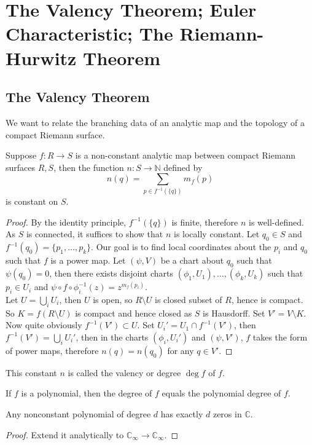 \section{The Valency Theorem; Euler Characteristic; The Riemann-Hurwitz Theorem}
\subsection{The Valency Theorem}
We want to relate the branching data of an analytic map and the topology of a compact Riemann surface.
\begin{theorem}
    Suppose $f:R\to S$ is a non-constant analytic map between compact Riemann surfaces $R,S$, then the function $n:S\to\mathbb N$ defined by
    $$n(q)=\sum_{p\in f^{-1}(\{q\})}m_f(p)$$
    is constant on $S$.
\end{theorem}
\begin{proof}
    By the identity principle, $f^{-1}(\{q\})$ is finite, therefore $n$ is well-defined.
    As $S$ is connected, it suffices to show that $n$ is locally constant.
    Let $q_0\in S$ and $f^{-1}(q_0)=\{p_1,\ldots,p_k\}$.
    Our goal is to find local coordinates about the $p_i$ and $q_0$ such that $f$ is a power map.
    Let $(\psi,V)$ be a chart about $q_0$ such that $\psi(q_0)=0$, then there exists disjoint charts $(\phi_1,U_1),\ldots,(\phi_k,U_k)$ such that $p_i\in U_i$ and $\psi\circ f\circ\phi_i^{-1}(z)=z^{m_f(p_i)}$.\\
    Let $U=\bigcup_iU_i$, then $U$ is open, so $R\setminus U$ is closed subset of $R$, hence is compact.
    So $K=f(R\setminus U)$ is compact and hence closed as $S$ is Hausdorff.
    Set $V'=V\setminus K$.
    Now quite obviously $f^{-1}(V')\subset U$.
    Set $U_i'=U_1\cap f^{-1}(V')$, then $f^{-1}(V')=\bigcup_iU_i'$, then in the charts $(\phi_i,U_i')$ and $(\psi,V')$, $f$ takes the form of power maps, therefore $n(q)=n(q_0)$ for any $q\in V'$.
\end{proof}
\begin{definition}
    This constant $n$ is called the valency or degree $\deg f$ of $f$.
\end{definition}
\begin{example}
    If $f$ is a polynomial, then the degree of $f$ equals the polynomial degree of $f$.
\end{example}
\begin{corollary}
    Any nonconstant polynomial of degree $d$ has exactly $d$ zeros in $\mathbb C$.
\end{corollary}
\begin{proof}
    Extend it analytically to $\mathbb C_\infty\to\mathbb C_\infty$.
\end{proof}